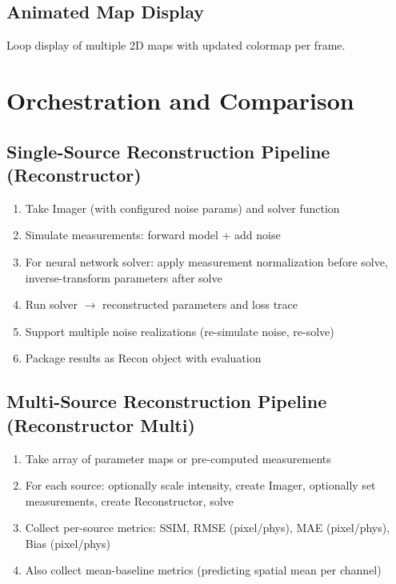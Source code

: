 \documentclass[11pt,a4paper]{article}
\begin{document}
\subsection{Animated Map Display}
Loop display of multiple 2D maps with updated colormap per frame.

\section{Orchestration and Comparison}

\subsection{Single-Source Reconstruction Pipeline (Reconstructor)}
\begin{enumerate}[nosep]
  \item Take Imager (with configured noise params) and solver function
  \item Simulate measurements: forward model + add noise
  \item For neural network solver: apply measurement normalization before solve, inverse-transform parameters after solve
  \item Run solver $\rightarrow$ reconstructed parameters and loss trace
  \item Support multiple noise realizations (re-simulate noise, re-solve)
  \item Package results as Recon object with evaluation
\end{enumerate}

\subsection{Multi-Source Reconstruction Pipeline (Reconstructor Multi)}
\begin{enumerate}[nosep]
  \item Take array of parameter maps or pre-computed measurements
  \item For each source: optionally scale intensity, create Imager, optionally set measurements, create Reconstructor, solve
  \item Collect per-source metrics: SSIM, RMSE (pixel/phys), MAE (pixel/phys), Bias (pixel/phys)
  \item Also collect mean-baseline metrics (predicting spatial mean per channel)
\end{enumerate}
\end{document}
